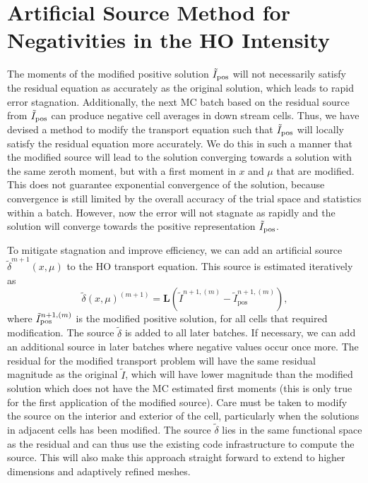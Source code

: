 \section{Artificial Source Method for Negativities in the HO Intensity}

The moments of the modified positive solution $\tilde I_{{\text{pos}}}$ will not necessarily
satisfy the residual equation as accurately as the original solution, which leads to rapid
error stagnation.  Additionally, the next MC batch based on the residual source from
$\tilde I_{{\text{pos}}}$ can produce negative cell averages in down stream cells.  Thus, we have
devised a method to modify the transport equation such that $\tilde I_{{\text{pos}}}$ will locally
satisfy the residual equation more accurately.  We do this in such a manner that the
modified source will lead to the solution converging towards a solution with the same
zeroth moment, but with a first moment in $x$ and $\mu$ that are modified.  This does not
guarantee exponential convergence of the solution, because convergence is still limited by
the overall accuracy of the trial space and statistics within a batch.  However, now the
error will not stagnate as rapidly and the solution will converge towards the positive
representation $\tilde I_{{\text{pos}}}$.

To mitigate stagnation and improve efficiency, we can add an artificial source
$\tilde\delta^{m+1}(x,\mu)$ to the HO transport equation.
This source is estimated iteratively as
\begin{equation*}
    \tilde\delta(x,\mu)^{(m+1)} = \mathbf{L}(\tilde{I}^{n+1,(m)} -
    \tilde{I}^{n+1,(m)}_{\text{pos}}),
\end{equation*}
where $\tilde{I}_{{\text{pos}}}^{n+1,(m)}$ is the modified positive solution, for all cells that required
modification.  The source $\tilde
\delta$ is added to all later batches.  If necessary, we can add an additional source in
later batches where negative values occur once more. The residual for the modified
transport problem will have the same residual magnitude as the original $\tilde I$, which
will have lower magnitude than the modified solution which does not have the MC estimated
first moments (this is only true for the first application of the modified source).  Care
must be taken to modify the source on the interior and exterior of the cell,
particularly when the solutions in adjacent cells has been modified.  The source
$\tilde\delta$ lies in the same functional space as the residual and can thus use the
existing code infrastructure to compute the source.  This will also make this approach
straight forward to extend to higher dimensions and adaptively refined meshes.  

